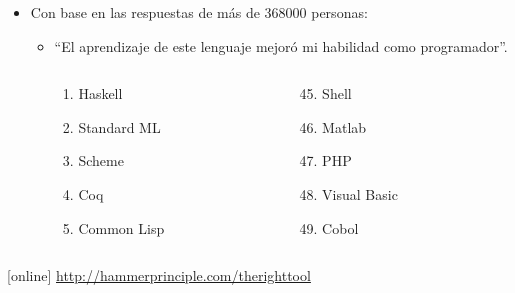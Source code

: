 \documentclass[spanish]{beamer}
\begin{document}
\begin{frame}
  \begin{itemize}
  \item
    Con base en las respuestas de más de 368000 personas:
    \begin{itemize}
    \item
      ``El aprendizaje de este lenguaje mejoró mi habilidad como
      programador''.
      \begin{columns}[T]
        \begin{column}{3cm}
          \begin{enumerate}
          \item Haskell
          \item Standard ML
          \item Scheme
          \item Coq
          \item Common Lisp
          \end{enumerate}
        \end{column}
        \begin{column}{3cm}
          \begin{enumerate}
          \setcounter{enumi}{44}
          \item Shell
          \item Matlab
          \item PHP
          \item Visual Basic
          \item Cobol
          \end{enumerate}
        \end{column}
      \end{columns}
    \end{itemize}
  \end{itemize}
  \begin{thebibliography}{}
  [online]
    \newblock \url{http://hammerprinciple.com/therighttool}
  \end{thebibliography}
\end{frame}

\end{document}
